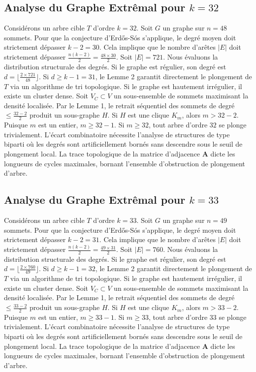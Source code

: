 \documentclass[11pt,a4paper]{article}
\begin{document}
\subsection{Analyse du Graphe Extr\^emal pour $k=32$}
Consid\'erons un arbre cible $T$ d'ordre $k=32$.
Soit $G$ un graphe sur $n=48$ sommets.
Pour que la conjecture d'Erd\H{o}s-S\'os s'applique, le degr\'e moyen doit strictement d\'epasser $k-2 = 30$.
Cela implique que le nombre d'ar\^etes $|E|$ doit strictement d\'epasser $\frac{n(k-2)}{2} = \frac{48 \times 30}{2}$.
Soit $|E| = 721$.
Nous \'evaluons la distribution structurale des degr\'es. Si le graphe est r\'egulier, son degr\'e est $d = \lfloor \frac{2 \times 721}{48} \rfloor$.
Si $d \geq k-1 = 31$, le Lemme 2 garantit directement le plongement de $T$ via un algorithme de tri topologique.
Si le graphe est hautement irr\'egulier, il existe un cluster dense. Soit $V_C \subset V$ un sous-ensemble de sommets maximisant la densit\'e localis\'ee.
Par le Lemme 1, le retrait s\'equentiel des sommets de degr\'e $\leq \frac{32-2}{2}$ produit un sous-graphe $H$.
Si $H$ est une clique $K_{m}$, alors $m > 32-2$. Puisque $m$ est un entier, $m \geq 32-1$. Si $m \geq 32$, tout arbre d'ordre $32$ se plonge trivialement.
L'\'ecart combinatoire n\'ecessite l'analyse de structures de type biparti o\`u les degr\'es sont artificiellement born\'es sans descendre sous le seuil de plongement local. La trace topologique de la matrice d'adjacence $\mathbf{A}$ dicte les longueurs de cycles maximales, bornant l'ensemble d'obstruction de plongement d'arbre.


\subsection{Analyse du Graphe Extr\^emal pour $k=33$}
Consid\'erons un arbre cible $T$ d'ordre $k=33$.
Soit $G$ un graphe sur $n=49$ sommets.
Pour que la conjecture d'Erd\H{o}s-S\'os s'applique, le degr\'e moyen doit strictement d\'epasser $k-2 = 31$.
Cela implique que le nombre d'ar\^etes $|E|$ doit strictement d\'epasser $\frac{n(k-2)}{2} = \frac{49 \times 31}{2}$.
Soit $|E| = 760$.
Nous \'evaluons la distribution structurale des degr\'es. Si le graphe est r\'egulier, son degr\'e est $d = \lfloor \frac{2 \times 760}{49} \rfloor$.
Si $d \geq k-1 = 32$, le Lemme 2 garantit directement le plongement de $T$ via un algorithme de tri topologique.
Si le graphe est hautement irr\'egulier, il existe un cluster dense. Soit $V_C \subset V$ un sous-ensemble de sommets maximisant la densit\'e localis\'ee.
Par le Lemme 1, le retrait s\'equentiel des sommets de degr\'e $\leq \frac{33-2}{2}$ produit un sous-graphe $H$.
Si $H$ est une clique $K_{m}$, alors $m > 33-2$. Puisque $m$ est un entier, $m \geq 33-1$. Si $m \geq 33$, tout arbre d'ordre $33$ se plonge trivialement.
L'\'ecart combinatoire n\'ecessite l'analyse de structures de type biparti o\`u les degr\'es sont artificiellement born\'es sans descendre sous le seuil de plongement local. La trace topologique de la matrice d'adjacence $\mathbf{A}$ dicte les longueurs de cycles maximales, bornant l'ensemble d'obstruction de plongement d'arbre.
\end{document}
